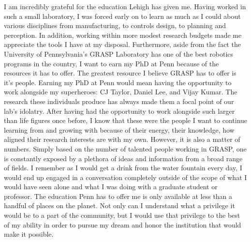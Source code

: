 \documentclass[12pt]{article}
\begin{document}
I am incredibly grateful for the education Lehigh has given me. Having worked
in such a small laboratory, I was forced early on to learn as much as I could
about various disciplines from manufacturing, to controls design, to planning
and perception. In addition, working within more modest research budgets made
me appreciate the tools I have at my disposal. Furthermore, aside from the fact
the University of Pennsylvania’s GRASP Laboratory has one of the best robotics
programs in the country, I want to earn my PhD at Penn because of the resources
it has to offer. The greatest resource I believe GRASP has to offer is it's
people.  Earning my PhD at Penn would mean having the opportunity to work
alongside my superheroes: CJ Taylor, Daniel Lee, and Vijay Kumar. The research
these individuals produce has always made them a focal point of our lab's
idolatry. After having had the opportunity to work alongside such larger than
life figures once before, I know that these were the people I want to continue
learning from and growing with because of their energy, their knowledge, how
aligned their research interests are with my own.  However, it is also a matter
of numbers. Simply based on the number of talented people working in GRASP, one
is constantly exposed by a plethora of ideas and information from a broad range
of fields.  I remember as I would get a drink from the water fountain every
day, I would end up engaged in a conversation completely outside of the scope
of what I would have seen alone and what I was doing with a graduate student or
professor. The education Penn has to offer me is only available at less than a
handful of places on the planet. Not only can I understand what a privilege it
would be to a part of the community, but I would use that privilege to the best
of my ability in order to pursue my dream and honor the institution that would
make it possible.
\end{document}
